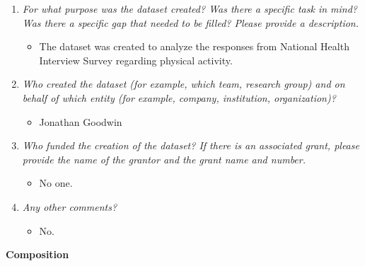 \documentclass[
]{article}
\providecommand{\tightlist}{%
  \setlength{\itemsep}{0pt}\setlength{\parskip}{0pt}}
\begin{document}
\begin{enumerate}
\def\labelenumi{\arabic{enumi}.}
\tightlist
\item
  \emph{For what purpose was the dataset created? Was there a specific task in mind? Was there a specific gap that needed to be filled? Please provide a description.}

  \begin{itemize}
  \tightlist
  \item
    The dataset was created to analyze the responses from National Health Interview Survey regarding physical activity.
  \end{itemize}
\item
  \emph{Who created the dataset (for example, which team, research group) and on behalf of which entity (for example, company, institution, organization)?}

  \begin{itemize}
  \tightlist
  \item
    Jonathan Goodwin
  \end{itemize}
\item
  \emph{Who funded the creation of the dataset? If there is an associated grant, please provide the name of the grantor and the grant name and number.}

  \begin{itemize}
  \tightlist
  \item
    No one.
  \end{itemize}
\item
  \emph{Any other comments?}

  \begin{itemize}
  \tightlist
  \item
    No.
  \end{itemize}
\end{enumerate}

\textbf{Composition}
\end{document}
